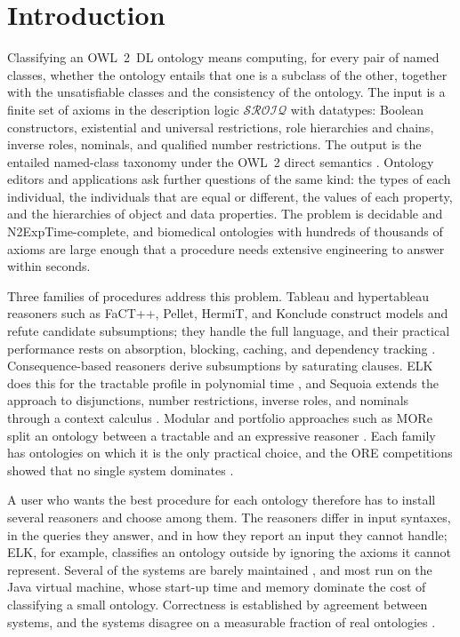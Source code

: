 \section{Introduction}

Classifying an OWL~2~DL ontology means computing, for every pair of named
classes, whether the ontology entails that one is a subclass of the other,
together with the unsatisfiable classes and the consistency of the ontology.
The input is a finite set of axioms in the description logic $\mathcal{SROIQ}$
with datatypes: Boolean constructors, existential and universal restrictions,
role hierarchies and chains, inverse roles, nominals, and qualified number
restrictions.  The output is the entailed named-class taxonomy under the OWL~2
direct semantics \cite{w3c2012direct}.  Ontology editors and applications ask
further questions of the same kind: the types of each individual, the
individuals that are equal or different, the values of each property, and the
hierarchies of object and data properties.  The problem is decidable and
N2ExpTime-complete, and biomedical ontologies with hundreds of thousands of
axioms are large enough that a procedure needs extensive engineering to answer
within seconds.

Three families of procedures address this problem.  Tableau and hypertableau
reasoners such as FaCT++, Pellet, HermiT, and Konclude construct models and
refute candidate subsumptions; they handle the full language, and their
practical performance rests on absorption, blocking, caching, and dependency
tracking \cite{tsarkov2006factpp,sirin2007pellet,motik2009hypertableau,
steigmiller2014konclude}.  Consequence-based reasoners derive subsumptions by
saturating clauses.  ELK does this for the tractable \EL{} profile in
polynomial time \cite{kazakov2014elk}, and Sequoia extends the approach to
disjunctions, number restrictions, inverse roles, and nominals through a
context calculus \cite{bate2016sequoia,tenacucala2018consequence}.  Modular
and portfolio approaches such as MORe split an ontology between a tractable
and an expressive reasoner \cite{armasromero2012more}.  Each family has
ontologies on which it is the only practical choice, and the ORE competitions
showed that no single system dominates \cite{parsia2017ore}.

A user who wants the best procedure for each ontology therefore has to install
several reasoners and choose among them.  The reasoners differ in input
syntaxes, in the queries they answer, and in how they report an input they
cannot handle; ELK, for example, classifies an ontology outside \EL{} by
ignoring the axioms it cannot represent.  Several of the systems are barely
maintained \cite{abicht2023owl}, and most run on the Java virtual machine,
whose start-up time and memory dominate the cost of classifying a small
ontology.  Correctness is established by agreement between systems, and the
systems disagree on a measurable fraction of real ontologies
\cite{lee2015correctness,parsia2017ore}.

